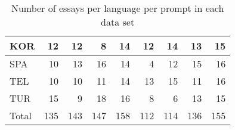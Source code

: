 \documentclass[11pt,letterpaper]{article}
\begin{document}
\begin{table*}[!ht]
\begin{small}
\begin{center}
{\begin{tabular}{lrrrrrrrr}
            KOR     &   12 & 12 & 8  & 14 & 12 & 14 & 13 & 15 \\ \hline
            SPA    &   10 & 13 & 16 & 14 & 4  & 12 & 15 & 16 \\ \hline
            TEL     &   10 & 10 & 11 & 14 & 13 & 15 & 11 & 16 \\ \hline
            TUR    &   15 & 9  & 18 & 16 & 8  & 6  & 13 & 15 \\ \hline \hline
            Total      &   135&143 & 147& 158& 112& 114& 136& 155 \\ \hline
        \end{tabular}
}
\end{center}
\end{small}
\caption{Number of essays per language per prompt in each data set}
\end{table*}
\end{document}

